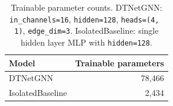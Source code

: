 \small
\begin{table}[h]
\centering
\caption{Trainable parameter counts. DTNetGNN: \texttt{in\_channels=16}, \texttt{hidden=128}, \texttt{heads=(4,\,1)}, \texttt{edge\_dim=3}. IsolatedBaseline: single hidden layer MLP with \texttt{hidden=128}.}
\label{tab:appE-params}
\begin{tabular}{l r}
\toprule
\textbf{Model} & \textbf{Trainable parameters}\\
\midrule
DTNetGNN & 78,466\\
IsolatedBaseline & 2,434\\
\bottomrule
\end{tabular}
\end{table}
